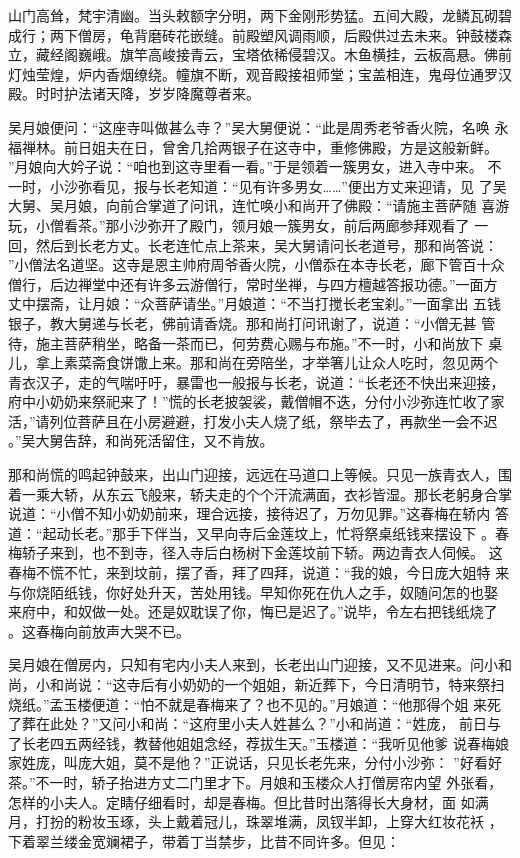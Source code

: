 山门高耸，梵宇清幽。当头敕额字分明，两下金刚形势猛。五间大殿，龙鳞瓦砌碧
成行；两下僧房，龟背磨砖花嵌缝。前殿塑风调雨顺，后殿供过去未来。钟鼓楼森
立，藏经阁巍峨。旗竿高峻接青云，宝塔依稀侵碧汉。木鱼横挂，云板高悬。佛前
灯烛莹煌，炉内香烟缭绕。幢旗不断，观音殿接祖师堂；宝盖相连，鬼母位通罗汉
殿。时时护法诸天降，岁岁降魔尊者来。

吴月娘便问：“这座寺叫做甚么寺？”吴大舅便说：“此是周秀老爷香火院，名唤
永福禅林。前日姐夫在日，曾舍几拾两银子在这寺中，重修佛殿，方是这般新鲜。
”月娘向大妗子说：“咱也到这寺里看一看。”于是领着一簇男女，进入寺中来。
不一时，小沙弥看见，报与长老知道：“见有许多男女……”便出方丈来迎请，见
了吴大舅、吴月娘，向前合掌道了问讯，连忙唤小和尚开了佛殿：“请施主菩萨随
喜游玩，小僧看茶。”那小沙弥开了殿门，领月娘一簇男女，前后两廊参拜观看了
一回，然后到长老方丈。长老连忙点上茶来，吴大舅请问长老道号，那和尚答说：
”小僧法名道坚。这寺是恩主帅府周爷香火院，小僧忝在本寺长老，廊下管百十众
僧行，后边禅堂中还有许多云游僧行，常时坐禅，与四方檀越答报功德。”一面方
丈中摆斋，让月娘：“众菩萨请坐。”月娘道：“不当打搅长老宝刹。”一面拿出
五钱银子，教大舅递与长老，佛前请香烧。那和尚打问讯谢了，说道：“小僧无甚
管待，施主菩萨稍坐，略备一茶而已，何劳费心赐与布施。”不一时，小和尚放下
桌儿，拿上素菜斋食饼馓上来。那和尚在旁陪坐，才举箸儿让众人吃时，忽见两个
青衣汉子，走的气喘吁吁，暴雷也一般报与长老，说道：“长老还不快出来迎接，
府中小奶奶来祭祀来了！”慌的长老披袈裟，戴僧帽不迭，分付小沙弥连忙收了家
活，”请列位菩萨且在小房避避，打发小夫人烧了纸，祭毕去了，再款坐一会不迟
。”吴大舅告辞，和尚死活留住，又不肯放。

那和尚慌的鸣起钟鼓来，出山门迎接，远远在马道口上等候。只见一族青衣人，围
着一乘大轿，从东云飞般来，轿夫走的个个汗流满面，衣衫皆湿。那长老躬身合掌
说道：“小僧不知小奶奶前来，理合远接，接待迟了，万勿见罪。”这春梅在轿内
答道：“起动长老。”那手下伴当，又早向寺后金莲坟上，忙将祭桌纸钱来摆设下
。春梅轿子来到，也不到寺，径入寺后白杨树下金莲坟前下轿。两边青衣人伺候。
这春梅不慌不忙，来到坟前，摆了香，拜了四拜，说道：“我的娘，今日庞大姐特
来与你烧陌纸钱，你好处升天，苦处用钱。早知你死在仇人之手，奴随问怎的也娶
来府中，和奴做一处。还是奴耽误了你，悔已是迟了。”说毕，令左右把钱纸烧了
。这春梅向前放声大哭不已。

吴月娘在僧房内，只知有宅内小夫人来到，长老出山门迎接，又不见进来。问小和
尚，小和尚说：“这寺后有小奶奶的一个姐姐，新近葬下，今日清明节，特来祭扫
烧纸。”孟玉楼便道：“怕不就是春梅来了？也不见的。”月娘道：“他那得个姐
来死了葬在此处？”又问小和尚：“这府里小夫人姓甚么？”小和尚道：“姓庞，
前日与了长老四五两经钱，教替他姐姐念经，荐拔生天。”玉楼道：“我听见他爹
说春梅娘家姓庞，叫庞大姐，莫不是他？”正说话，只见长老先来，分付小沙弥：
”好看好茶。”不一时，轿子抬进方丈二门里才下。月娘和玉楼众人打僧房帘内望
外张看，怎样的小夫人。定睛仔细看时，却是春梅。但比昔时出落得长大身材，面
如满月，打扮的粉妆玉琢，头上戴着冠儿，珠翠堆满，凤钗半卸，上穿大红妆花袄
，下着翠兰缕金宽斓裙子，带着丁当禁步，比昔不同许多。但见：

